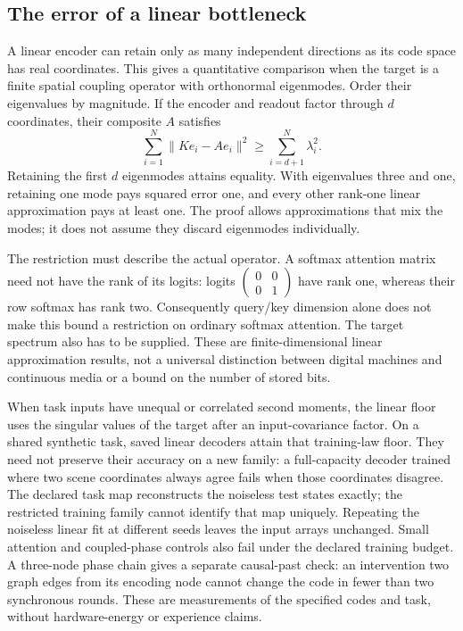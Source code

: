 \documentclass[11pt]{article}
\begin{document}
\subsection{The error of a linear bottleneck}

A linear encoder can retain only as many independent directions as its code
space has real coordinates. This gives a quantitative comparison when the
target is a finite spatial coupling operator with orthonormal eigenmodes.
Order their eigenvalues by magnitude. If the encoder and readout factor through
$d$ coordinates, their composite $A$ satisfies
\[
 \sum_{i=1}^N\|Ke_i-Ae_i\|^2\geq\sum_{i=d+1}^N\lambda_i^2.
\]
Retaining the first $d$ eigenmodes attains equality. With eigenvalues three and
one, retaining one mode pays squared error one, and every other rank-one
linear approximation pays at least one. The proof allows approximations that
mix the modes; it does not assume they discard eigenmodes individually.

The restriction must describe the actual operator. A softmax attention matrix
need not have the rank of its logits: logits
$\left(\begin{smallmatrix}0&0\\0&1\end{smallmatrix}\right)$ have rank one,
whereas their row softmax has rank two. Consequently query/key dimension alone
does not make this bound a restriction on ordinary softmax attention.
The target spectrum also has to be supplied. These are finite-dimensional
linear approximation results, not a universal distinction between digital
machines and continuous media or a bound on the number of stored bits.

When task inputs have unequal or correlated second moments, the linear floor
uses the singular values of the target after an input-covariance factor.
On a shared synthetic task, saved linear decoders attain that training-law
floor. They need not preserve their accuracy on a new family: a full-capacity
decoder trained where two scene coordinates always agree fails when those
coordinates disagree. The declared task map reconstructs the noiseless test
states exactly; the restricted training family cannot identify that map
uniquely. Repeating the noiseless linear fit at different seeds leaves the
input arrays unchanged. Small attention and coupled-phase controls also fail
under the declared training budget. A three-node phase chain gives a separate
causal-past check: an intervention two graph edges from its encoding node
cannot change the code in fewer than two synchronous rounds. These are
measurements of the specified codes and task, without hardware-energy or
experience claims.
\end{document}
